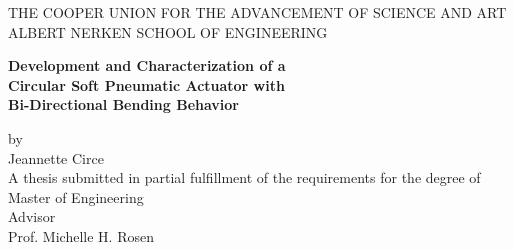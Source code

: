 \documentclass[12pt]{report}
\begin{document}
\begin{center}
\thispagestyle{empty}
\uppercase{THE COOPER UNION FOR THE ADVANCEMENT OF SCIENCE AND ART}\\[-0.9ex]
\uppercase{ALBERT NERKEN SCHOOL OF ENGINEERING}\\[-2ex]

\vspace{2cm}
\begin{center}
\textbf{\LARGE{Development and Characterization of a}} \\ 
\textbf{\LARGE{Circular Soft Pneumatic Actuator with}} \\ 
\textbf{\LARGE{Bi-Directional Bending Behavior}}
\medskip\par
\normalsize{by} \\
\Large{Jeannette Circe}\\
\vspace{4 cm}
\normalsize{A thesis submitted in partial fulfillment of the requirements for the degree of \\ Master of Engineering } \\
\vspace{3 cm}
\normalsize{Advisor}\\
\normalsize{Prof. Michelle H. Rosen}\\
\vspace{0.6cm}
\end{center}
\medskip
\end{center}
\clearpage
\end{document}
